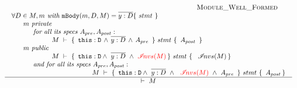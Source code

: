 {$
\\ \\
\begin{array}{l}
\inferruleSD {  ~ \strut \hspace{3cm} {\sc{Module\_Well\_Formed}}}
{
\begin{array}{l} 
\forall  D\in M,  m   \textit{ with } \prg{mBody}(m,D,M)=\overline{y:D}\{\  stmt \ \}      \\
        ~ \strut \hspace{0.5cm} m \textit{ private}  \\ 
            ~ \strut \hspace{0.9cm} \textit{ for all its  specs } A_{pre},  A_{post}:\\ 
             ~\strut \hspace{2cm}
 					   {\hproves{M} { \ \prg{this}:\prg{D}\, \wedge\, \overline{y:D}\, \wedge\, A_{pre}\  } {\ stmt\ } {\ A_{post} \ } }\\
      ~ \strut \hspace{0.5cm} m \textit{ public}  \\ 
          ~ \strut \hspace{2cm}  { \hproves {M} {\ \prg{this}:\prg{D} \wedge\ \overline{y:D}   \ \wedge \  \red{\extract{M}}}  {\ stmt\ } {\ \ \extract{M} } }\\
    ~ \strut \hspace{0.9cm} \textit{ and for all its  specs } A_{pre},  A_{post}:\\ 
             ~\strut \hspace{2cm}   
              ~ \strut \hspace{2cm}  { \hproves {M} {\ \prg{this}:\prg{D} \wedge\ \overline{y:D}  \ \wedge \ \ \red{\extract{M} } \ \wedge \ A_{pre}\ } {\ stmt\ } {\ A_{post} }  }
\end{array}
}					  					  
{   
	\ \vdash\ M \ 
}
\end{array}
$


}
